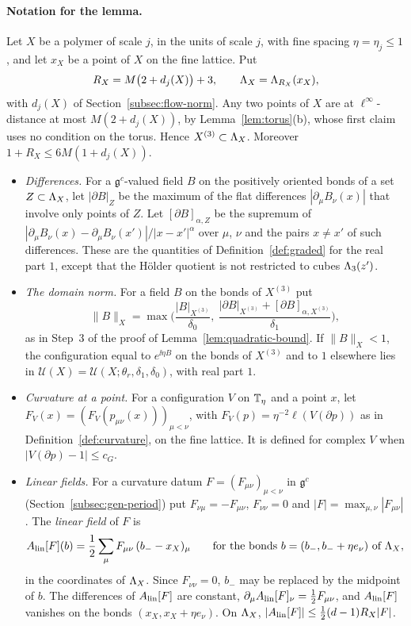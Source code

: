 \paragraph{Notation for the lemma.} Let $X$ be a polymer of scale $j$, in the units of scale $j$, with fine spacing $\eta=\eta_j\le1$, and let $x_X$ be a point of $X$ on the fine lattice. Put
\[
R_X=M\big(2+d_j(X)\big)+3,\qquad\Lambda_X=\Lambda_{R_X}(x_X),
\]
with $d_j(X)$ of Section~\ref{subsec:flow-norm}. Any two points of $X$ are at $\ell^\infty$-distance at most $M(2+d_j(X))$, by Lemma~\ref{lem:torus}(b), whose first claim uses no condition on the torus. Hence $X^{(3)}\subset\Lambda_X$. Moreover $1+R_X\le6M(1+d_j(X))$.
\begin{itemize}
\item \emph{Differences.} For a $\mathfrak g^c$-valued field $B$ on the positively oriented bonds of a set $Z\subset\Lambda_X$, let $|\partial B|_Z$ be the maximum of the flat differences $|\partial_\mu B_\nu(x)|$ that involve only points of $Z$. Let $[\partial B]_{\alpha,Z}$ be the supremum of $|\partial_\mu B_\nu(x)-\partial_\mu B_\nu(x')|/|x-x'|^\alpha$ over $\mu$, $\nu$ and the pairs $x\ne x'$ of such differences. These are the quantities of Definition~\ref{def:graded} for the real part $1$, except that the H\"older quotient is not restricted to cubes $\Lambda_3(z')$.
\item \emph{The domain norm.} For a field $B$ on the bonds of $X^{(3)}$ put
\[
\|B\|_X=\max\Big(\frac{|B|_{X^{(3)}}}{\delta_0},\ \frac{|\partial B|_{X^{(3)}}+[\partial B]_{\alpha,X^{(3)}}}{\delta_1}\Big),
\]
as in Step~3 of the proof of Lemma~\ref{lem:quadratic-bound}. If $\|B\|_X<1$, the configuration equal to $e^{\ii\eta B}$ on the bonds of $X^{(3)}$ and to $1$ elsewhere lies in $\mathcal U(X)=\mathcal U(X;\theta_r,\delta_1,\delta_0)$, with real part $1$.
\item \emph{Curvature at a point.} For a configuration $V$ on $\mathbb T_\eta$ and a point $x$, let $F_V(x)=(F_V(p_{\mu\nu}(x)))_{\mu<\nu}$, with $F_V(p)=\eta^{-2}\ell(V(\partial p))$ as in Definition~\ref{def:curvature}, on the fine lattice. It is defined for complex $V$ when $|V(\partial p)-1|\le c_G$.
\item \emph{Linear fields.} For a curvature datum $F=(F_{\mu\nu})_{\mu<\nu}$ in $\mathfrak g^c$ (Section~\ref{subsec:gen-period}) put $F_{\nu\mu}=-F_{\mu\nu}$, $F_{\nu\nu}=0$ and $|F|=\max_{\mu,\nu}|F_{\mu\nu}|$. The \emph{linear field} of $F$ is
\[
A_{\rm lin}[F](b)=\frac12\sum_\mu F_{\mu\nu}\,(b_--x_X)_\mu\qquad\text{for the bonds }b=(b_-,b_-+\eta e_\nu)\text{ of }\Lambda_X,
\]
in the coordinates of $\Lambda_X$. Since $F_{\nu\nu}=0$, $b_-$ may be replaced by the midpoint of $b$. The differences of $A_{\rm lin}[F]$ are constant, $\partial_\mu A_{\rm lin}[F]_\nu=\frac12F_{\mu\nu}$, and $A_{\rm lin}[F]$ vanishes on the bonds $(x_X,x_X+\eta e_\nu)$. On $\Lambda_X$, $|A_{\rm lin}[F]|\le\frac12(d-1)R_X|F|$.
\end{itemize}


